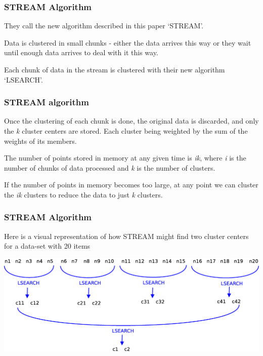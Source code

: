 \documentclass{beamer}
\begin{document}
\frame
{
  \frametitle{STREAM Algorithm}

  They call the new algorithm described in this paper `STREAM'.

  \bigskip
  Data is clustered in small chunks - either the data
  arrives this way or they wait until enough data arrives to deal with
  it this way.

  \bigskip
  Each chunk of data in the stream is clustered with their new
  algorithm `LSEARCH'.

}


\frame
{
  \frametitle{STREAM algorithm}


 Once the clustering of each chunk is done, the original data is
 discarded, and only the {\em k} cluster centers are stored. Each
 cluster being weighted by the sum of the weights of its members.

 \bigskip
 The number of points stored in memory at any given time is {\em ik},
 where {\em i} is the number of chunks of data processed and {\em k}
 is the number of clusters.

 \bigskip
 If the number of points in memory becomes too large, at any point we
 can cluster the {\em ik} clusters to reduce the data to just {\em k}
 clusters.

}


\frame
{
  \frametitle{STREAM Algorithm}
  Here is a visual representation of how STREAM might find two cluster
  centers for a data-set with 20 items
  
  \bigskip
  \begin{center}
  \includegraphics[width=\textwidth]{figures/STREAM}      
  \end{center}
}
\end{document}
